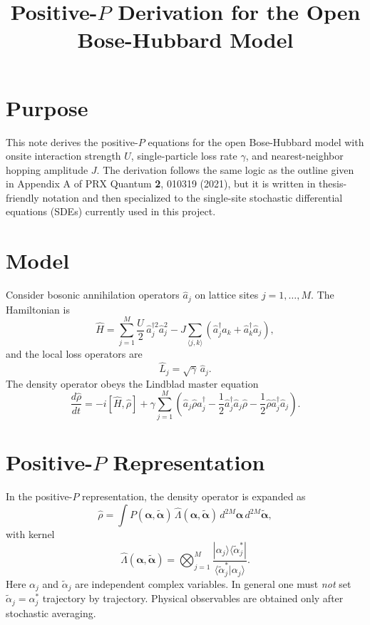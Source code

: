 \documentclass[12pt]{article}
\title{Positive-$P$ Derivation for the Open Bose-Hubbard Model}
\author{}
\date{}
\begin{document}
\maketitle

\section*{Purpose}
This note derives the positive-$P$ equations for the open Bose-Hubbard model with onsite interaction strength $U$, single-particle loss rate $\gamma$, and nearest-neighbor hopping amplitude $J$. The derivation follows the same logic as the outline given in Appendix A of PRX Quantum \textbf{2}, 010319 (2021), but it is written in thesis-friendly notation and then specialized to the single-site stochastic differential equations (SDEs) currently used in this project.

\section*{Model}
Consider bosonic annihilation operators $\hat a_j$ on lattice sites $j=1,\dots,M$. The Hamiltonian is
\[
\hat H
=
\sum_{j=1}^M \frac{U}{2}\,\hat a_j^{\dagger 2}\hat a_j^2
-J\sum_{\langle j,k\rangle}
\left(
\hat a_j^\dagger \hat a_k + \hat a_k^\dagger \hat a_j
\right),
\]
and the local loss operators are
\[
\hat L_j = \sqrt{\gamma}\,\hat a_j.
\]
The density operator obeys the Lindblad master equation
\[
\frac{d\hat\rho}{dt}
=
-i[\hat H,\hat\rho]
+
\gamma \sum_{j=1}^M
\left(
\hat a_j \hat\rho \hat a_j^\dagger
- \frac12 \hat a_j^\dagger \hat a_j \hat\rho
- \frac12 \hat\rho \hat a_j^\dagger \hat a_j
\right).
\]

\section*{Positive-$P$ Representation}
In the positive-$P$ representation, the density operator is expanded as
\[
\hat\rho
=
\int P(\bm{\alpha},\bm{\widetilde{\alpha}})\,
\hat\Lambda(\bm{\alpha},\bm{\widetilde{\alpha}})\,
d^{2M}\bm{\alpha}\,d^{2M}\bm{\widetilde{\alpha}},
\]
with kernel
\[
\hat\Lambda(\bm{\alpha},\bm{\widetilde{\alpha}})
=
\bigotimes_{j=1}^M
\frac{|\alpha_j\rangle\langle \widetilde{\alpha}_j^*|}
{\langle \widetilde{\alpha}_j^*|\alpha_j\rangle}.
\]
Here $\alpha_j$ and $\widetilde{\alpha}_j$ are independent complex variables. In general one must \emph{not} set $\widetilde{\alpha}_j = \alpha_j^*$ trajectory by trajectory. Physical observables are obtained only after stochastic averaging.
\end{document}
